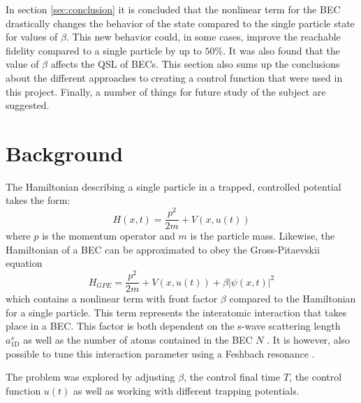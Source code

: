 \documentclass[a4paper, twocolumn]{revtex4-1}
\begin{document}
In section \ref{sec:conclusion} it is concluded that the nonlinear term for the BEC drastically changes the behavior of the state compared to the single particle state for values of $\beta$. This new behavior could, in some cases, improve the reachable fidelity compared to a single particle by up to $50\%$. It was also found that the value of $\beta$ affects the QSL of BECs. This section also sums up the conclusions about the different approaches to creating a control function that were used in this project. Finally, a number of things for future study of the subject are suggested.

\section{\label{sec:back}Background}
The Hamiltonian describing a single particle in a trapped, controlled potential takes the form:
\begin{equation}
	H(x,t) = \frac{p^2}{2m} + V(x,u(t))
\end{equation}
where $p$ is the momentum operator and $m$ is the particle mass. Likewise, the Hamiltonian of a BEC can be approximated to obey the Gross-Pitaevskii equation
\begin{equation}
	H_{GPE} = \frac{p^2}{2m} + V(x,u(t)) + \beta |\psi(x,t)|^2
	\label{eq:Hbec}
\end{equation}
which contains a nonlinear term with front factor $\beta$ compared to the Hamiltonian for a single particle. This term represents the interatomic interaction that takes place in a BEC. This factor is both dependent on the s-wave scattering length $a_{\text{1D}}^s$ as well as the number of atoms contained in the BEC $N$ \cite{Schmiedmayer}. It is however, also possible to tune this interaction parameter using a Feshbach resonance \cite{Feshbach}.


The problem was explored by adjusting $\beta$, the control final time $T$, the control function $u(t)$ as well as working with different trapping potentials.
\end{document}
